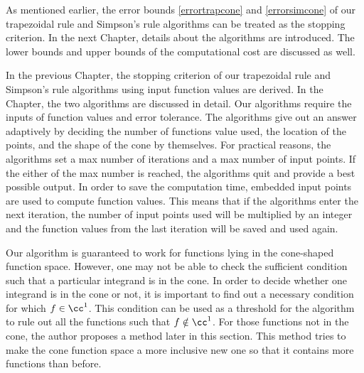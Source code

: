 \documentclass{iitthesis}
\DeclareMathOperator{\Var}{Var}
\theoremstyle{definition}
\theoremstyle{remark}
\begin{document}
As mentioned earlier, the error bounds \eqref{errortrapcone} and \eqref{errorsimcone} of our trapezoidal rule and Simpson's rule algorithms can be treated as the stopping criterion. In the next Chapter, details about the algorithms are introduced. The lower bounds and upper bounds of the computational cost are discussed as well.

%






In the previous Chapter, the stopping criterion of our trapezoidal rule and Simpson's rule algorithms using input function values are derived. In the Chapter, the two algorithms are discussed in detail. Our algorithms require the inputs of function values and error tolerance. The algorithms give out an answer adaptively by deciding the number of functions value used, the location of the points, and the shape of the cone by themselves. For practical reasons, the algorithms set a max number of iterations and a max number of input points. If the either of the max number is reached, the algorithms quit and provide a best possible output. In order to save the computation time, embedded input points are used to compute function values. This means that if the algorithms enter the next iteration, the number of input points used will be multiplied by an integer and the function values from the last iteration will be saved and used again.


Our algorithm is guaranteed to work for functions lying in the cone-shaped function space. However, one may not be able to check the sufficient condition such that a particular integrand is in the cone. In order to decide whether one integrand is in the cone or not, it is important to find out a necessary condition for which $f\in\cc^1$. This condition can be used as a threshold for the algorithm to rule out all the functions such that $f\notin\cc^1$. For those functions not in the cone, the author proposes a method later in this section. This method tries to make the cone function space a more inclusive new one so that it contains more functions than before.
\end{document}

